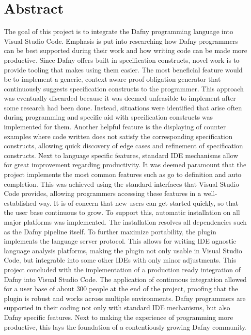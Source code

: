\section{Abstract}
The goal of this project is to integrate the Dafny programming language into Visual Studio Code. Emphasis is put into researching how Dafny programmers can be best supported during their work and how writing code can be made more productive.\newline 
Since Dafny offers built-in specification constructs, novel work is to provide tooling that makes using them easier. The most beneficial feature would be to implement a generic, context aware proof obligation generator that continuously suggests specification constructs to the programmer. This approach was eventually discarded because it was deemed unfeasible to implement after some research had been done. Instead, situations were identified that arise often during programming and specific aid with specification constructs was implemented for them. Another helpful feature is the displaying of counter examples where code written does not satisfy the corresponding specification constructs, allowing quick discovery of edge cases and refinement of specification constructs.\newline 
Next to language specific features, standard IDE mechanisms allow for great improvement regarding productivity. It was deemed paramount that the project implements the most common features such as go to definition and auto completion. This was achieved using the standard interfaces that Visual Studio Code provides, allowing programmers accessing these features in a well-established way.\newline
It is of concern that new users can get started quickly, so that the user base continuous to grow. To support this, automatic installation on all major platforms was implemented. The installation resolves all dependencies such as the Dafny pipeline itself. To further maximize portability, the plugin implements the language server protocol. This allows for writing IDE agnostic language analysis platforms, making the plugin not only usable in Visual Studio Code, but integrable into some other IDEs with only minor adjustments.\newline
This project concluded with the implementation of a production ready integration of Dafny into Visual Studio Code. The application of continuous integration allowed for a user base of about 300 people at the end of the project, proofing that the plugin is robust and works across multiple environments. Dafny programmers are supported in their coding not only with standard IDE mechanisms, but also Dafny specific features. Next to making the experience of programming more productive, this lays the foundation of a contentiously growing Dafny community.\newline
